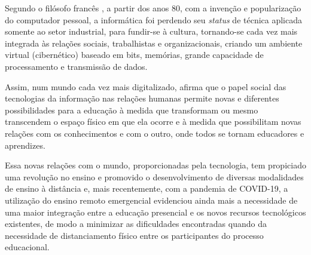 Segundo o filósofo francês \cite{Levy:2010}, a partir dos anos 80, com a invenção e popularização do computador pessoal, a informática foi perdendo seu {\it status} de técnica aplicada somente ao setor industrial, para fundir-se à cultura, tornando-se cada vez mais integrada às relações sociais, trabalhistas e organizacionais, criando um ambiente virtual (cibernético) baseado em bits, memórias, grande capacidade de processamento e transmissão de dados.

Assim, num mundo cada vez mais digitalizado, \cite{Kenski:2007} afirma que o papel social das tecnologias da informação nas relações humanas permite novas e diferentes possibilidades para a educação à medida que transformam ou mesmo transcendem o espaço físico em que ela ocorre e à medida que possibilitam novas relações com os conhecimentos e com o outro, onde todos se tornam educadores e aprendizes.


Essa novas relações com o mundo, proporcionadas pela tecnologia, tem propiciado uma revolução no ensino e promovido o desenvolvimento de diversas modalidades de ensino à distância e, mais recentemente, com a pandemia de COVID-19, a utilização do ensino remoto emergencial evidenciou ainda mais a necessidade de uma maior integração entre a educação presencial e os novos recursos tecnológicos existentes, de modo a minimizar as dificuldades encontradas quando da necessidade de distanciamento físico entre os participantes do processo educacional.

